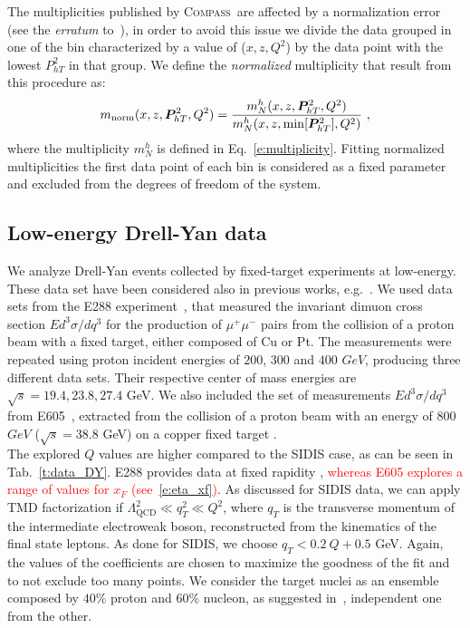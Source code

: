 \documentclass[aps,preprintnumbers,showpacs,nofootinbib,superscriptaddress,floatfix]{revtex4}
\newcommand{\compass}{\textsc{Compass}}
\newcommand{\Tperp}{T}
\begin{document}
The multiplicities published by \compass\ are affected by a normalization error (see the {\em erratum} to~\cite{Adolph:2013stb}), in order to avoid this issue we divide the data grouped in one of the bin characterized by a value of ($x, z, Q^2$) by the data point with the lowest $P_{hT}^2$ in that group.
We define the {\em normalized} multiplicity that result from this procedure as:
\begin{equation}
m_{\text{norm}}(x,z,\bm{P}_{h\Tperp}^2, Q^2) = \frac{m_N^h(x,z,\bm{P}_{h\Tperp}^2, Q^2)}{m_N^h (x,z,{\rm \min}[\bm{P}_{h\Tperp}^2], Q^2)} \ ,
\label{e:mult_norm}
\end{equation}
where the multiplicity $m_N^h$ is defined in Eq.~\eqref{e:multiplicity}. Fitting normalized multiplicities the first data point of each bin is considered as a fixed parameter and excluded from the degrees of freedom of the system.

\subsection{Low-energy Drell-Yan data}
\label{ss:dy}

We analyze Drell-Yan events collected by fixed-target experiments at low-energy. These data set have been considered also in previous works, e.g.~\cite{DAlesio:2014mrz}. 
We used data sets from the E288 experiment~\cite{Ito:1980ev}, that measured the invariant dimuon cross section $E d^3\sigma / dq^3$ for the production of $\mu^+ \mu^-$ pairs from the collision of a proton beam with a fixed target, either composed of Cu or Pt.
The measurements were repeated using proton incident energies of $200$, $300$ and $400$ $GeV$, producing three different data sets.
Their respective center of mass energies are $\sqrt{s}=19.4,23.8,27.4$ GeV.
We also included the set of measurements $E d^3\sigma / dq^3$ from E605~\cite{Moreno:1990sf}, extracted from the collision of a proton beam with an energy of $800$ $GeV$ ($\sqrt{s}=38.8$ GeV) on a copper fixed target .\\

The explored $Q$ values are higher compared to the SIDIS case, as can be seen in Tab.~\ref{t:data_DY}. E288 provides data at fixed rapidity ,\textcolor{red}{ whereas E605 explores a range of values for $x_F$ (see~\eqref{e:eta_xf})}.  
As discussed for SIDIS data, we can apply TMD factorization if $\Lambda_{\text{QCD}}^2 \ll q_T^2 \ll Q^2$, where $q_T$ is the transverse momentum of the intermediate electroweak boson, reconstructed from the kinematics of the final state leptons. As done for SIDIS, we choose $q_T < 0.2\ Q + 0.5$ GeV. Again, the values of the coefficients are chosen to maximize the goodness of the fit and to not exclude too many points.
We consider the target nuclei as an ensemble composed by $40\%$ proton and $60\%$ nucleon, as suggested in~\cite{Ito:1980ev}, independent one from the other.
\end{document}

